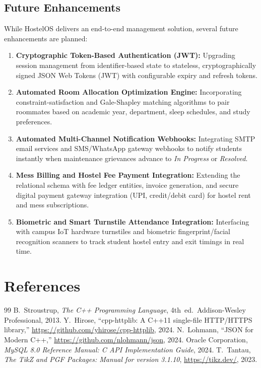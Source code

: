\documentclass[12pt,a4paper]{article}
\begin{document}
\subsection{Future Enhancements}
\label{sec:future}
While HostelOS delivers an end-to-end management solution, several future enhancements are planned:
\begin{enumerate}
    \item \textbf{Cryptographic Token-Based Authentication (JWT):}
    Upgrading session management from identifier-based state to stateless, cryptographically signed JSON Web Tokens (JWT) with configurable expiry and refresh tokens.
    
    \item \textbf{Automated Room Allocation Optimization Engine:}
    Incorporating constraint-satisfaction and Gale-Shapley matching algorithms to pair roommates based on academic year, department, sleep schedules, and study preferences.
    
    \item \textbf{Automated Multi-Channel Notification Webhooks:}
    Integrating SMTP email services and SMS/WhatsApp gateway webhooks to notify students instantly when maintenance grievances advance to \textit{In Progress} or \textit{Resolved}.
    
    \item \textbf{Mess Billing and Hostel Fee Payment Integration:}
    Extending the relational schema with fee ledger entities, invoice generation, and secure digital payment gateway integration (UPI, credit/debit card) for hostel rent and mess subscriptions.
    
    \item \textbf{Biometric and Smart Turnstile Attendance Integration:}
    Interfacing with campus IoT hardware turnstiles and biometric fingerprint/facial recognition scanners to track student hostel entry and exit timings in real time.
\end{enumerate}

\section*{References}
\label{sec:references}
\begin{thebibliography}{99}
 B.~Stroustrup, \emph{The C++ Programming Language}, 4th~ed.\ Addison-Wesley Professional, 2013.
 Y.~Hirose, ``cpp-httplib: A C++11 single-file HTTP/HTTPS library,'' \url{https://github.com/yhirose/cpp-httplib}, 2024.
 N.~Lohmann, ``JSON for Modern C++,'' \url{https://github.com/nlohmann/json}, 2024.
 Oracle Corporation, \emph{MySQL 8.0 Reference Manual: C API Implementation Guide}, 2024.
 T.~Tantau, \emph{The TikZ and PGF Packages: Manual for version 3.1.10}, \url{https://tikz.dev/}, 2023.
\end{thebibliography}
\end{document}
